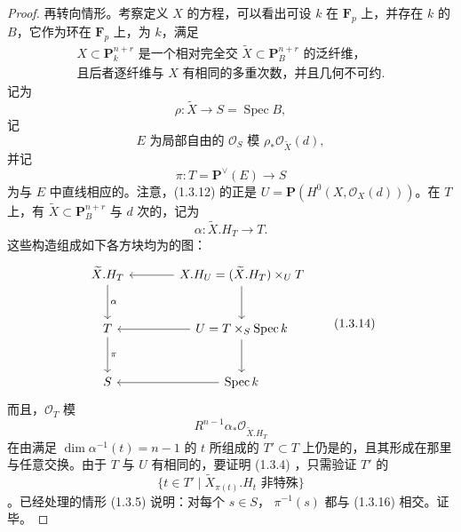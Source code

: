 \begin{proof}
再转向情形。考察定义 $X$ 的方程，可以看出可设 $k$ 在 $\mathbf F_p$ 上，并存在 $k$ 的 $B$，它作为环在 $\mathbf F_p$ 上，为 $k$，满足
\[
 \begin{gathered}
 X\subset\mathbf P^{n+r}_k\text{ 是一个相对完全交 }
 \widetilde X\subset\mathbf P^{n+r}_B\text{ 的泛纤维，}\\
 \text{且后者逐纤维与 }X\text{ 有相同的多重次数，并且几何不可约}.
 \end{gathered}
 \tag{1.3.9}
\]
记为
\[
 \rho:\widetilde X\longrightarrow S=\operatorname{Spec}B,
 \tag{1.3.10}
\]
记
\[
 E\text{ 为局部自由的 }\mathcal O_S\text{ 模 }\rho_*\mathcal O_{\widetilde X}(d),
 \tag{1.3.11}
\]
并记
\[
 \pi:T=\mathbf P^\vee(E)\longrightarrow S
 \tag{1.3.12}
\]
为与 $E$ 中直线相应的。注意，(1.3.12) 的正是 $U=\mathbf P(H^0(X,\mathcal O_X(d)))$。在 $T$ 上，有 $\widetilde X\subset\mathbf P^{n+r}_B$ 与 $d$ 次的，记为
\[
 \alpha:\widetilde X.H_T\longrightarrow T.
 \tag{1.3.13}
\]
这些构造组成如下各方块均为的图：
\[
\begin{tikzcd}[column sep=large,row sep=large]
 \widetilde X.H_T\arrow[d,"\alpha"] &
 X.H_U=(\widetilde X.H_T)\times_U T\arrow[l]\arrow[d]\\
 T\arrow[d,"\pi"] & U=T\times_S\operatorname{Spec}k\arrow[l]\arrow[d]\\
 S & \operatorname{Spec}k\arrow[l]
\end{tikzcd}
\tag{1.3.14}
\]
而且，$\mathcal O_T$ 模
\[
 R^{n-1}\alpha_*\mathcal O_{\widetilde X.H_T}
 \tag{1.3.15}
\]
在由满足 $\dim\alpha^{-1}(t)=n-1$ 的 $t$ 所组成的 $T'\subset T$ 上仍是的，且其形成在那里与任意交换。由于 $T$ 与 $U$ 有相同的，要证明 (1.3.4) ，只需验证 $T'$ 的
\[
 \{t\in T'\mid\widetilde X_{\pi(t)}.H_t\text{ 非特殊}\}
 \tag{1.3.16}
\]
。已经处理的情形 (1.3.5) 说明：对每个
 $s\in S$， $\pi^{-1}(s)$ 都与 (1.3.16) 相交。证毕。
\end{proof}

